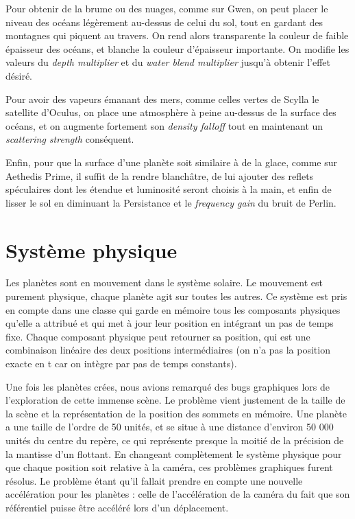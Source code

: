 \documentclass[a4paper,12pt,twoside]{article}
\begin{document}
Pour obtenir de la brume ou des nuages, comme sur Gwen, on peut placer le niveau des océans légèrement au-dessus de celui du sol, tout en gardant des montagnes qui piquent au travers. On rend alors transparente la couleur de faible épaisseur des océans, et blanche la couleur d'épaisseur importante. On modifie les valeurs du \textit{depth multiplier} et du \textit{water blend multiplier} jusqu'à obtenir l'effet désiré.

Pour avoir des vapeurs émanant des mers, comme celles vertes de Scylla le satellite d’Oculus, on place une atmosphère à peine au-dessus de la surface des océans, et on augmente fortement son \textit{density falloff} tout en maintenant un \textit{scattering strength} conséquent.

Enfin, pour que la surface d'une planète soit similaire à de la glace, comme sur Aethedis Prime, il suffit de la rendre blanchâtre, de lui ajouter des reflets spéculaires dont les étendue et luminosité seront choisis à la main, et enfin de lisser le sol en diminuant la Persistance et le \textit{frequency gain} du bruit de Perlin.



\section{Système physique}

Les planètes sont en mouvement dans le système solaire. Le mouvement est purement physique, chaque planète agit sur toutes les autres. Ce système est pris en compte dans une classe qui garde en mémoire tous les composants physiques qu'elle a attribué et qui met à jour leur position en intégrant un pas de temps fixe. Chaque composant physique peut retourner sa position, qui est une combinaison linéaire des deux positions intermédiaires (on n'a pas la position exacte en t car on intègre par pas de temps constants).

Une fois les planètes crées, nous avions remarqué des bugs graphiques lors de l'exploration de cette immense scène. Le problème vient justement de la taille de la scène et la représentation de la position des sommets en mémoire. Une planète a une taille de l'ordre de 50 unités, et se situe à une distance d'environ 50 000 unités du centre du repère, ce qui représente presque la moitié de la précision de la mantisse d'un flottant. En changeant complètement le système physique pour que chaque position soit relative à la caméra, ces problèmes graphiques furent résolus. Le problème étant qu'il fallait prendre en compte une nouvelle accélération pour les planètes : celle de l'accélération de la caméra du fait que son référentiel puisse être accéléré lors d'un déplacement.
\end{document}
